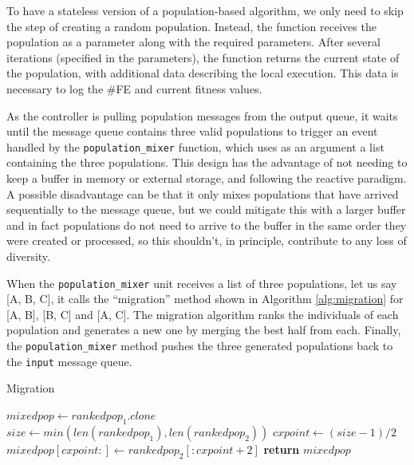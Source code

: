 \documentclass[runningheads]{llncs}
\begin{document}
To have a stateless version of a population-based algorithm, we only need to
skip the step of creating a random population. Instead, the function receives
the population as a parameter along with the required parameters. After several
iterations (specified in the parameters), the function returns the current state
of the population, with additional data describing the local execution. This
data is necessary to log the \#FE and current fitness values.



As the controller is pulling population messages from the output
queue, it waits until the message queue contains three valid
populations to trigger an event handled by the
\texttt{population\_mixer} function, which uses as an argument a list
containing the three populations. This design has the advantage of not
needing to keep a buffer in memory or external storage, and following
the reactive paradigm. A possible disadvantage can be that it only
mixes populations that have arrived sequentially to the message queue,
but we could mitigate this with a larger buffer and in fact
populations do not need to arrive to the buffer in the same order they
were created or processed, so this shouldn't, in principle, contribute
to any loss of diversity. %

When the \texttt{population\_mixer} unit receives a list of three
populations, let us say [A, B, C], it calls the ``migration'' method shown
in Algorithm \ref{alg:migration} for [A, B], [B, C] and [A, C]. The
migration algorithm ranks the individuals of each population and
generates a new one by merging the best half from each. Finally, the
\texttt{population\_mixer} method pushes the three generated
populations back to the \texttt{input} message queue.
%
\begin{algorithm} %
    \caption{Migration}
    \label{alg:migration}
    \begin{algorithmic}[1]
            \State $mixedpop \gets rankedpop_1.clone$
            \State $size\gets min(len(rankedpop_1), len(rankedpop_2))$
            \State $cxpoint\gets (size-1)/2$
            \State $mixedpop[cxpoint:]\gets rankedpop_2[:cxpoint+2]$
            \State \textbf{return} $mixedpop$
        \EndProcedure 
    \end{algorithmic}
\end{algorithm}
\end{document}
